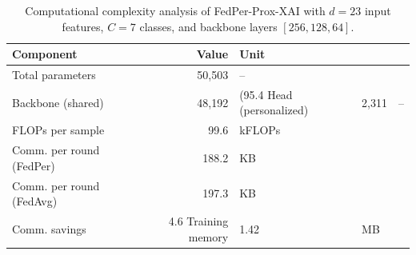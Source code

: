 \begin{table}[t]
\centering
\caption{Computational complexity analysis of FedPer-Prox-XAI with $d{=}23$ input features, $C{=}7$ classes, and backbone layers $[256, 128, 64]$.}
\label{tab:complexity}
\begin{tabular}{lrl}
\toprule
Component & Value & Unit \\
\midrule
Total parameters & 50,503 & -- \\
Backbone (shared) & 48,192 & (95.4%
Head (personalized) & 2,311 & -- \\
FLOPs per sample & 99.6 & kFLOPs \\
Comm. per round (FedPer) & 188.2 & KB \\
Comm. per round (FedAvg) & 197.3 & KB \\
Comm. savings & 4.6%
Training memory & 1.42 & MB \\
\bottomrule
\end{tabular}
\end{table}
